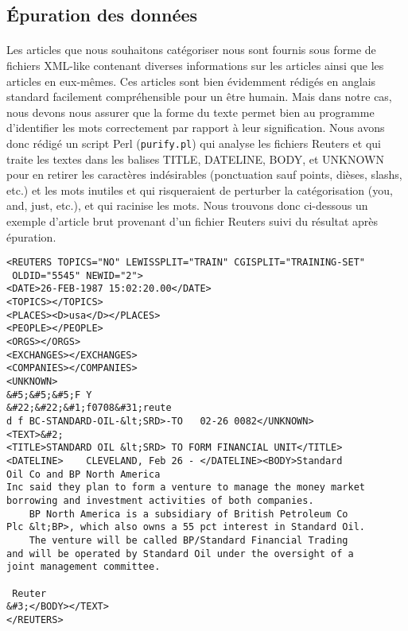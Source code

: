 \subsection{Épuration des données}

\paragraph{}
Les articles que nous souhaitons catégoriser nous sont fournis sous forme de fichiers XML-like contenant diverses informations sur les articles ainsi que les articles en eux-mêmes. Ces articles sont bien évidemment rédigés en anglais standard facilement compréhensible pour un être humain. Mais dans notre cas, nous devons nous assurer que la forme du texte permet bien au programme d'identifier les mots correctement par rapport à leur signification. Nous avons donc rédigé un script Perl (\texttt{purify.pl}) qui analyse les fichiers Reuters et qui traite les textes dans les balises TITLE, DATELINE, BODY, et UNKNOWN pour en retirer les caractères indésirables (ponctuation sauf points, dièses, slashs, etc.) et les mots inutiles et qui risqueraient de perturber la catégorisation (you, and, just, etc.), et qui racinise les mots. Nous trouvons donc ci-dessous un exemple d'article brut provenant d'un fichier Reuters suivi du résultat après épuration.

\lstset{language=XML}
\begin{lstlisting}
<REUTERS TOPICS="NO" LEWISSPLIT="TRAIN" CGISPLIT="TRAINING-SET"
 OLDID="5545" NEWID="2">
<DATE>26-FEB-1987 15:02:20.00</DATE>
<TOPICS></TOPICS>
<PLACES><D>usa</D></PLACES>
<PEOPLE></PEOPLE>
<ORGS></ORGS>
<EXCHANGES></EXCHANGES>
<COMPANIES></COMPANIES>
<UNKNOWN> 
&#5;&#5;&#5;F Y
&#22;&#22;&#1;f0708&#31;reute
d f BC-STANDARD-OIL-&lt;SRD>-TO   02-26 0082</UNKNOWN>
<TEXT>&#2;
<TITLE>STANDARD OIL &lt;SRD> TO FORM FINANCIAL UNIT</TITLE>
<DATELINE>    CLEVELAND, Feb 26 - </DATELINE><BODY>Standard 
Oil Co and BP North America
Inc said they plan to form a venture to manage the money market
borrowing and investment activities of both companies.
    BP North America is a subsidiary of British Petroleum Co
Plc &lt;BP>, which also owns a 55 pct interest in Standard Oil.
    The venture will be called BP/Standard Financial Trading
and will be operated by Standard Oil under the oversight of a
joint management committee.

 Reuter
&#3;</BODY></TEXT>
</REUTERS>
\end{lstlisting}

